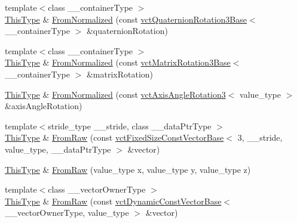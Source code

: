 \begin{DoxyCompactItemize}
\item 
{\footnotesize template$<$class \+\_\+\+\_\+container\+Type $>$ }\\\hyperlink{classvct_rodriguez_rotation3_base_add2bccab7f6e86c98b3f97fd00b06dcc}{This\+Type} \& \hyperlink{classvct_rodriguez_rotation3_base_a9bbc2e37b3687fcc9d45e68e1f49b588}{From\+Normalized} (const \hyperlink{classvct_quaternion_rotation3_base}{vct\+Quaternion\+Rotation3\+Base}$<$ \+\_\+\+\_\+container\+Type $>$ \&quaternion\+Rotation)
\item 
{\footnotesize template$<$class \+\_\+\+\_\+container\+Type $>$ }\\\hyperlink{classvct_rodriguez_rotation3_base_add2bccab7f6e86c98b3f97fd00b06dcc}{This\+Type} \& \hyperlink{classvct_rodriguez_rotation3_base_a1a9a12522ff3e0a0c2a0774845ee8122}{From\+Normalized} (const \hyperlink{classvct_matrix_rotation3_base}{vct\+Matrix\+Rotation3\+Base}$<$ \+\_\+\+\_\+container\+Type $>$ \&matrix\+Rotation)
\item 
\hyperlink{classvct_rodriguez_rotation3_base_add2bccab7f6e86c98b3f97fd00b06dcc}{This\+Type} \& \hyperlink{classvct_rodriguez_rotation3_base_a5e9fe66b636e0004dc7258c3779bb578}{From\+Normalized} (const \hyperlink{classvct_axis_angle_rotation3}{vct\+Axis\+Angle\+Rotation3}$<$ value\+\_\+type $>$ \&axis\+Angle\+Rotation)
\item 
{\footnotesize template$<$stride\+\_\+type \+\_\+\+\_\+stride, class \+\_\+\+\_\+data\+Ptr\+Type $>$ }\\\hyperlink{classvct_rodriguez_rotation3_base_add2bccab7f6e86c98b3f97fd00b06dcc}{This\+Type} \& \hyperlink{classvct_rodriguez_rotation3_base_aec3c2b4ac5cfc2302620bd5ce61caafc}{From\+Raw} (const \hyperlink{classvct_fixed_size_const_vector_base}{vct\+Fixed\+Size\+Const\+Vector\+Base}$<$ 3, \+\_\+\+\_\+stride, value\+\_\+type, \+\_\+\+\_\+data\+Ptr\+Type $>$ \&vector)
\item 
\hyperlink{classvct_rodriguez_rotation3_base_add2bccab7f6e86c98b3f97fd00b06dcc}{This\+Type} \& \hyperlink{classvct_rodriguez_rotation3_base_a4c04d695f509f7e6bd94478537982af6}{From\+Raw} (value\+\_\+type x, value\+\_\+type y, value\+\_\+type z)
\item 
{\footnotesize template$<$class \+\_\+\+\_\+vector\+Owner\+Type $>$ }\\\hyperlink{classvct_rodriguez_rotation3_base_add2bccab7f6e86c98b3f97fd00b06dcc}{This\+Type} \& \hyperlink{classvct_rodriguez_rotation3_base_ac2f626adaa2104ec45a1211e31cffa79}{From\+Raw} (const \hyperlink{classvct_dynamic_const_vector_base}{vct\+Dynamic\+Const\+Vector\+Base}$<$ \+\_\+\+\_\+vector\+Owner\+Type, value\+\_\+type $>$ \&vector)

\end{DoxyCompactItemize}

